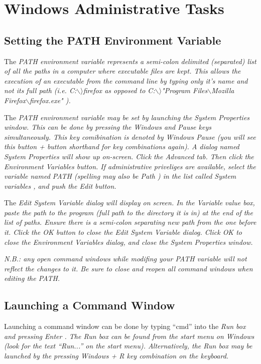 

\chapter{Windows Administrative Tasks} 
\section{Setting the PATH Environment Variable}\label{path}
The \em PATH \em environment variable represents a semi-colon delimited (separated) list of all the paths in a computer where executable files are kept. This allows the execution of an executable from the command line by typing only it's name and not its full path (i.e. \em C:$\backslash$$\rangle$firefox \em as opposed to \em C:$\backslash$$\rangle$"Program Files$\backslash$Mozilla Firefox$\backslash$firefox.exe" \em).

The \em PATH \em environment variable may be set by launching the System Properties window. This can be done by pressing the \em Windows \em and \em Pause \em keys simultaneously. This key comibination is denoted by \em Windows  Pause \em (you will see this \em button + button \em shorthand for key combinations again). A dialog named \em System Properties \em will show up on-screen. Click the \em Advanced \em tab. Then click the \em Environment Variables \em button. If administrative priveliges are available, select the variable named \em PATH \em (spelling may also be \em Path \em) in the list called \em System variables \em, and push the \em Edit \em button.

The \em Edit System Variable \em dialog will display on screen. In the \em Variable value \em box, paste the path to the program (full path to the directory it is in) at the end of the list of paths. Ensure there is a semi-colon separating new path from the one before it. Click the \em OK \em button to close the \em Edit System Variable \em dialog. Click \em OK \em to close the \em Environment Variables \em dialog, and close the \em System Properties \em window.

\em N.B.: any open command windows while modifing your PATH variable will not reflect the changes to it. Be sure to close and reopen all command windows when editing the PATH. \em

\section{Launching a Command Window}\label{launch-command-window}
Launching a command window can be done by typing ``cmd'' into the \em Run \em box and pressing \em Enter \em. The \em Run \em box can be found from the \em start \em menu on Windows (look for the text ``Run...'' on the start menu). Alternatively, the \em Run \em box may be launched by the pressing \em Windows + R \em key combination on the keyboard.

